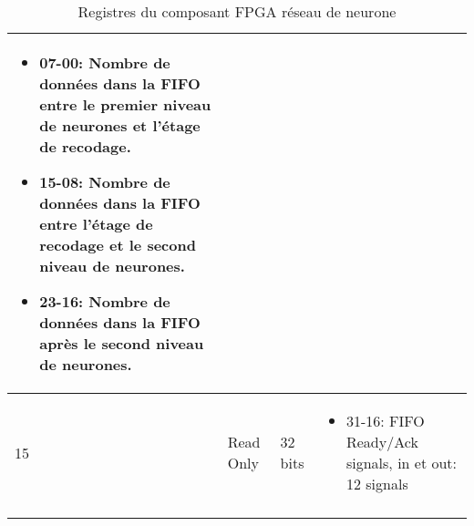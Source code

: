 \begin{longtable}{| p{} | p{} | p{} | p{} |}
\begin{itemize}
		\item 07-00: Nombre de données dans la FIFO entre le premier niveau de neurones et l'étage de recodage.
		\item 15-08: Nombre de données dans la FIFO entre l'étage de recodage et le second niveau de neurones.
		\item 23-16: Nombre de données dans la FIFO après le second niveau de neurones.
	\end{itemize}\\ \hline
	15 & Read Only & 32 bits &
	\begin{itemize}
		\item 31-16: FIFO Ready/Ack signals, in et out: 12 signals
	\end{itemize}\\ \hline
\caption{Registres du composant FPGA réseau de neurone}
\label{fig:user_manual_registers}
\end{longtable}
